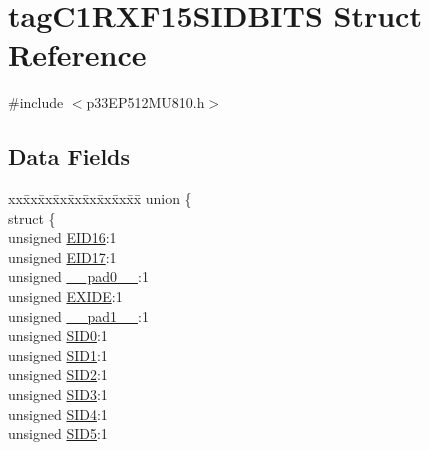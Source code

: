 \hypertarget{structtag_c1_r_x_f15_s_i_d_b_i_t_s}{}\section{tag\+C1\+R\+X\+F15\+S\+I\+D\+B\+I\+TS Struct Reference}
\label{structtag_c1_r_x_f15_s_i_d_b_i_t_s}


{\ttfamily \#include $<$p33\+E\+P512\+M\+U810.\+h$>$}

\subsection*{Data Fields}
\begin{DoxyCompactItemize}
\item 
\begin{tabbing}
xx\=xx\=xx\=xx\=xx\=xx\=xx\=xx\=xx\=\kill
union \{\\
\>struct \{\\
\>\>unsigned \hyperlink{structtag_c1_r_x_f15_s_i_d_b_i_t_s_a6dd5663b0c9838c56db040560ca0efa1}{EID16}:1\\
\>\>unsigned \hyperlink{structtag_c1_r_x_f15_s_i_d_b_i_t_s_aa648615464b0eb29967529333eee9fd9}{EID17}:1\\
\>\>unsigned \hyperlink{structtag_c1_r_x_f15_s_i_d_b_i_t_s_adf71f3d8410c1f1dbbc96680a92c49af}{\_\_pad0\_\_}:1\\
\>\>unsigned \hyperlink{structtag_c1_r_x_f15_s_i_d_b_i_t_s_a09ff1c1be3927220bd3dfbc10edfe243}{EXIDE}:1\\
\>\>unsigned \hyperlink{structtag_c1_r_x_f15_s_i_d_b_i_t_s_acaf2d0924a107ec6e8d2e31febaf66f9}{\_\_pad1\_\_}:1\\
\>\>unsigned \hyperlink{structtag_c1_r_x_f15_s_i_d_b_i_t_s_a1ca276ac15df60e1f7b9a6d0011ade93}{SID0}:1\\
\>\>unsigned \hyperlink{structtag_c1_r_x_f15_s_i_d_b_i_t_s_a3405d354f81391f879648f69f504dfc8}{SID1}:1\\
\>\>unsigned \hyperlink{structtag_c1_r_x_f15_s_i_d_b_i_t_s_ad744966dfc49307f731b7045b01b94e5}{SID2}:1\\
\>\>unsigned \hyperlink{structtag_c1_r_x_f15_s_i_d_b_i_t_s_a9345f3e64720be93e83d8dfc827f3f45}{SID3}:1\\
\>\>unsigned \hyperlink{structtag_c1_r_x_f15_s_i_d_b_i_t_s_aefb106fed4bb40e2c3c71ac612c554e3}{SID4}:1\\
\>\>unsigned \hyperlink{structtag_c1_r_x_f15_s_i_d_b_i_t_s_a0f221b3c9612231686bf87ccdcec8489}{SID5}:1\\

\end{tabbing}
\end{DoxyCompactItemize}
